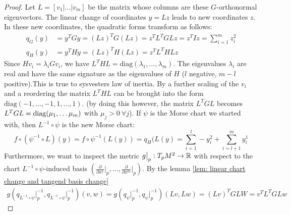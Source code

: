 \begin{proof}
	Let $L = [v_1 | \dots | v_m]$ be the matrix whose columns are these $G$-orthonormal eigenvectors. The linear change of coordinates 
	 $y = Lz$ leads to new coordinates $z$. In these new coordinates, the quadratic forms transform as follows:
	\begin{align*}
		q_G(y) &= y^T G y = (Lz)^T G (Lz) = z^T L^T G L z = z^T I z = \sum_{i=1}^m z_i^2 \\
		q_H(y) &= y^T H y = (Lz)^T H (Lz) = z^T L^T H L z
	\end{align*}
	Since $H v_i = \lambda_i G v_i$, we have $L^T H L = \text{diag}(\lambda_1, \dots, \lambda_m)$. The eigenvalues $\lambda_i$ are real and have the same signature as the eigenvalues of $H$ ($l$ negative, $m-l$ positive).This is true to sysvesters law of inertia.  By a further scaling of the $v_i$ and a reordering the matrix $L^T H L$ can be brought into the form $\text{diag}(-1, \dots, -1, 1, \dots, 1)$. (by doing this however, the matrix $L^TGL$ becomes $L^TGL=\mathrm{diag}(\mu_1,\dots \mu_m)$ with $\mu_j>0~\forall j$). If $\psi$ is the Morse chart we started with, then $L^{-1} \circ \psi$ is the new Morse chart: 
	\begin{equation*}
		f\circ (\psi^{-1}\circ L)(y)=f\circ \psi^{-1}(L(y))=q_H(L(y)=\sum_{i=1}^l-y_i^2+\sum_{i=l+1}^my_i^1
	\end{equation*}
	Furthermore, we want to inspect the metric $g\big|_p:T_pM^2\to \mathbb{R}$ with respect to the chart $ L^{-1}\circ \psi $-induced basis $\left( \frac{\partial}{\partial x^1}\big|_p,\dots ,\frac{\partial}{\partial x^m}\big|_p\right)$. By the lemma \ref{lem: linear chart change and tangend basis change}
	\begin{align*}
		g(q_{L^{-1}\circ \psi}\big|_p^{-1},q_{L^{-1}\circ \psi}\big|_p^{-1})(v,w)=	g(q_{\psi}\big|_p^{-1},q_{\psi }\big|_p^{-1})(Lv,Lw)=(Lv)^T G LW=v^T L^TGLw	
		\end{align*}
\end{proof}



